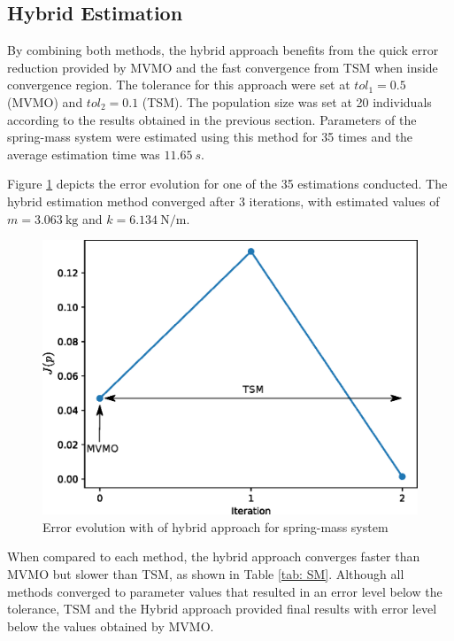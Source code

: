 \subsection{Hybrid Estimation}

By combining both methods, the hybrid approach benefits from the quick error reduction provided by MVMO and the fast convergence from TSM when inside convergence region. The tolerance for this approach were set at $tol_{1} = 0.5$ (MVMO) and $tol_{2} = 0.1$ (TSM). The population size was set at 20 individuals according to the results obtained in the previous section. Parameters of the spring-mass system were estimated using this method for 35 times and the average estimation time was $11.65\ s$.

Figure \ref{fig: Hybrid_conv} depicts the error evolution for one of the 35 estimations conducted. The hybrid estimation method converged after 3 iterations, with estimated values of $m=3.063\ \text{kg}$ and $k=6.134\ \text{N/m}$.

\begin{figure}[h]
	\caption{Error evolution with of hybrid approach for spring-mass system}
	\begin{center}
		\includegraphics[scale=0.7]{Images/Hybrid_conv_.eps}
	\end{center}
	\label{fig: Hybrid_conv}
\end{figure}

When compared to each method, the hybrid approach converges faster than MVMO but slower than TSM, as shown in Table \ref{tab: SM}. Although all methods converged to parameter values that resulted in an error level below the tolerance, TSM and the Hybrid approach provided final results with error level below the values obtained by MVMO.

